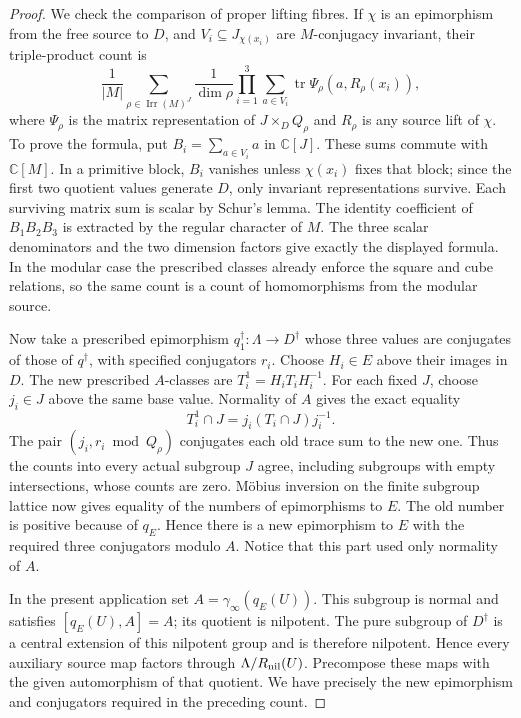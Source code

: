 \begin{proof}
We check the comparison of proper lifting fibres. If $\chi$ is an
epimorphism from the free source to $D$, and
$V_i\subseteq J_{\chi(x_i)}$ are $M$-conjugacy invariant, their
triple-product count is
\[
 \frac1{|M|}
 \sum_{\rho\in\operatorname{Irr}(M)^J}
 \frac1{\dim\rho}
 \prod_{i=1}^3
 \sum_{a\in V_i}\operatorname{tr}\Psi_\rho(a,R_\rho(x_i)),
\]
where $\Psi_\rho$ is the matrix representation of
$J\times_DQ_\rho$ and $R_\rho$ is any source lift of $\chi$.
To prove the formula, put $B_i=\sum_{a\in V_i}a$ in
$\mathbb C[J]$. These sums commute with $\mathbb C[M]$.
In a primitive block, $B_i$ vanishes unless $\chi(x_i)$ fixes
that block; since the first two quotient values generate $D$,
only invariant representations survive. Each surviving matrix
sum is scalar by Schur's lemma. The identity coefficient of
$B_1B_2B_3$ is extracted by the regular character of $M$.
The three scalar denominators and the two dimension factors give
exactly the displayed formula. In the modular case the prescribed
classes already enforce the square and cube relations, so the same
count is a count of homomorphisms from the modular source.

Now take a prescribed epimorphism $q_1^\dagger:\Lambda\to
D^\dagger$ whose three values are conjugates of those of
$q^\dagger$, with specified conjugators $r_i$. Choose
$H_i\in E$ above their images in $D$. The new prescribed
$A$-classes are $T_i^1=H_iT_iH_i^{-1}$.
For each fixed $J$, choose $j_i\in J$ above the same base value.
Normality of $A$ gives the exact equality
\[
                 T_i^1\cap J=j_i(T_i\cap J)j_i^{-1}.
\]
The pair $(j_i,r_i\bmod Q_\rho)$ conjugates each old trace
sum to the new one. Thus the counts into every actual subgroup
$J$ agree, including subgroups with empty intersections, whose
counts are zero. M\"obius inversion on the finite subgroup
lattice now gives equality of the numbers of epimorphisms to
$E$. The old number is positive because of $q_E$. Hence there
is a new epimorphism to $E$ with the required three conjugators
modulo $A$. Notice that this part used only normality of $A$.

In the present application set
$A=\gamma_\infty(q_E(U))$. This subgroup is normal and satisfies
$[q_E(U),A]=A$; its quotient is nilpotent. The pure subgroup of
$D^\dagger$ is a central extension of this nilpotent group and
is therefore nilpotent. Hence every auxiliary source map factors
through $\Lambda/R_{\rm nil}(U)$. Precompose these maps with
the given automorphism of that quotient. We have precisely the
new epimorphism and conjugators required in the preceding count.


\end{proof}
